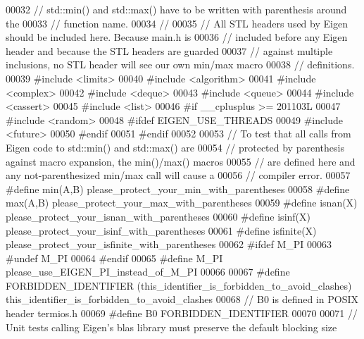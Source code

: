 \begin{DoxyCode}
00032 \textcolor{comment}{// std::min() and std::max() have to be written with parenthesis around the}
00033 \textcolor{comment}{// function name.}
00034 \textcolor{comment}{//}
00035 \textcolor{comment}{// All STL headers used by Eigen should be included here.  Because main.h is}
00036 \textcolor{comment}{// included before any Eigen header and because the STL headers are guarded}
00037 \textcolor{comment}{// against multiple inclusions, no STL header will see our own min/max macro}
00038 \textcolor{comment}{// definitions.}
00039 \textcolor{preprocessor}{#include <limits>}
00040 \textcolor{preprocessor}{#include <algorithm>}
00041 \textcolor{preprocessor}{#include <complex>}
00042 \textcolor{preprocessor}{#include <deque>}
00043 \textcolor{preprocessor}{#include <queue>}
00044 \textcolor{preprocessor}{#include <cassert>}
00045 \textcolor{preprocessor}{#include <list>}
00046 \textcolor{preprocessor}{#if \_\_cplusplus >= 201103L}
00047 \textcolor{preprocessor}{#include <random>}
00048 \textcolor{preprocessor}{#ifdef EIGEN\_USE\_THREADS}
00049 \textcolor{preprocessor}{#include <future>}
00050 \textcolor{preprocessor}{#endif}
00051 \textcolor{preprocessor}{#endif}
00052 
00053 \textcolor{comment}{// To test that all calls from Eigen code to std::min() and std::max() are}
00054 \textcolor{comment}{// protected by parenthesis against macro expansion, the min()/max() macros}
00055 \textcolor{comment}{// are defined here and any not-parenthesized min/max call will cause a}
00056 \textcolor{comment}{// compiler error.}
00057 \textcolor{preprocessor}{#define min(A,B) please\_protect\_your\_min\_with\_parentheses}
00058 \textcolor{preprocessor}{#define max(A,B) please\_protect\_your\_max\_with\_parentheses}
00059 \textcolor{preprocessor}{#define isnan(X) please\_protect\_your\_isnan\_with\_parentheses}
00060 \textcolor{preprocessor}{#define isinf(X) please\_protect\_your\_isinf\_with\_parentheses}
00061 \textcolor{preprocessor}{#define isfinite(X) please\_protect\_your\_isfinite\_with\_parentheses}
00062 \textcolor{preprocessor}{#ifdef M\_PI}
00063 \textcolor{preprocessor}{#undef M\_PI}
00064 \textcolor{preprocessor}{#endif}
00065 \textcolor{preprocessor}{#define M\_PI please\_use\_EIGEN\_PI\_instead\_of\_M\_PI}
00066 
00067 \textcolor{preprocessor}{#define FORBIDDEN\_IDENTIFIER (this\_identifier\_is\_forbidden\_to\_avoid\_clashes)
       this\_identifier\_is\_forbidden\_to\_avoid\_clashes}
00068 \textcolor{comment}{// B0 is defined in POSIX header termios.h}
00069 \textcolor{preprocessor}{#define B0 FORBIDDEN\_IDENTIFIER}
00070 
00071 \textcolor{comment}{// Unit tests calling Eigen's blas library must preserve the default blocking size}

\end{DoxyCode}
